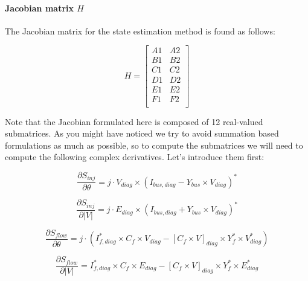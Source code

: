 \documentclass[nols,a4paper,twoside,notoc,fleqn]{tufte-book}
\begin{document}
\paragraph{Jacobian matrix $H$}

The Jacobian matrix for the state estimation method is found as follows:

\begin{equation}
H=
\left[
\begin{array}{cc}
A1 &
A2 \\
B1 &
B2 \\
C1 &
C2 \\
D1 &
D2 \\
E1 &
E2 \\
F1 &
F2 \\
\end{array}
\right]
\label{SE_jacobian}
\end{equation}

Note that the Jacobian formulated here is composed of 12 real-valued submatrices. As you might have noticed we try to avoid summation based formulations as much as possible, so to compute the submatrices we will need to compute the following complex derivatives. Let's introduce them first:


\begin{equation}
\frac{\partial S_{inj}}{\partial \theta} = j \cdot V_{diag} \times (I_{bus,diag}-Y_{bus} \times V_{diag}  )^* 
\end{equation}


\begin{equation}\frac{\partial S_{inj}}{\partial |V|}=j \cdot E_{diag} \times (I_{bus,diag} + Y_{bus} \times V_{diag}  )^* \end{equation}

\begin{equation}\frac{\partial S_{flow}}{\partial \theta} = j \cdot (I_{f,diag}^* \times C_f \times V_{diag} - [C_f \times V]_{diag} \times Y_f^* \times V_{diag}^* ) 
\end{equation}

\begin{equation}\frac{\partial S_{flow}}{\partial |V|}=I_{f,diag}^* \times C_f \times E_{diag}- [C_f \times V]_{diag} \times Y_f^* \times E_{diag}^* 
\end{equation}

\end{document}

